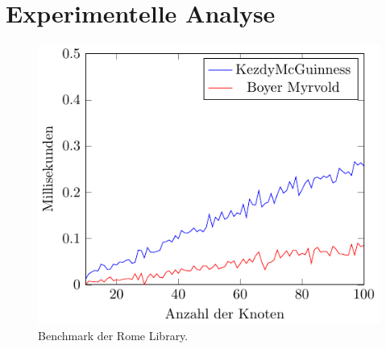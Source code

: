 \chapter{Experimentelle Analyse}
\label{cha:analyse}

\begin{figure}[H]
  \centering
  \includegraphics[width=\textwidth,height=\textheight,keepaspectratio]{plots/Rome_Benchmark.pdf}
  \caption{Benchmark der Rome Library.}
  \label{fig:Rome-Library}
\end{figure}
